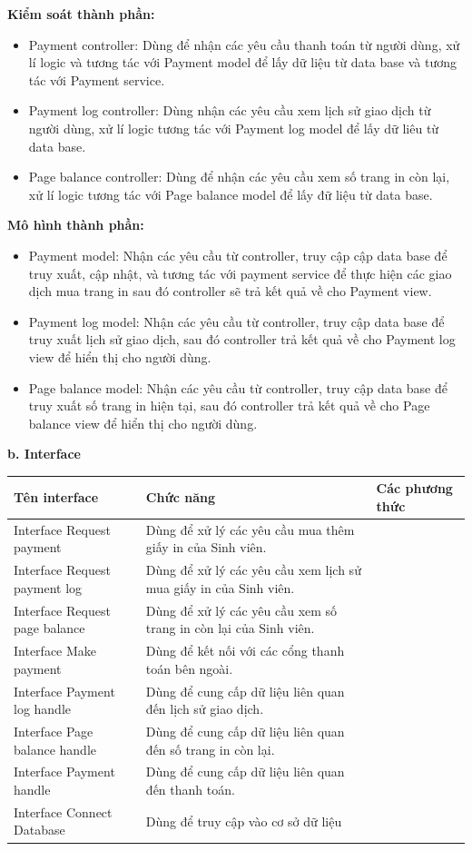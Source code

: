 \documentclass[a4paper]{article}
\begin{document}
\noindent \textbf{Kiểm soát thành phần:}
\begin{itemize}
    \item Payment controller: Dùng để nhận các yêu cầu thanh toán từ người dùng, xử lí logic và tương tác với Payment model để lấy dữ liệu từ data base và tương tác với Payment service. 
    \item Payment log controller: Dùng nhận các yêu cầu xem lịch sử giao dịch từ người dùng, xử lí logic tương tác với Payment log model để lấy dữ liêu từ data base.
    \item Page balance controller: Dùng để nhận các yêu cầu xem số trang in còn lại, xử lí logic tương tác với Page balance model để lấy đữ liệu từ data base.
\end{itemize}
\noindent \textbf{Mô hình thành phần:}
\begin{itemize}
    \item Payment model: Nhận các yêu cầu từ controller, truy cập cập data base để truy xuất, cập nhật, và tương tác với payment service để thực hiện các giao dịch mua trang in sau đó controller sẽ trả kết quả về cho Payment view.
    \item Payment log model: Nhận các yêu cầu từ controller, truy cập data base để truy xuất lịch sử giao dịch, sau đó controller trả kết quả về cho Payment log view để hiển thị cho người dùng.
     \item Page balance model: Nhận các yêu cầu từ controller, truy cập data base để truy xuất số trang in hiện tại, sau đó controller trả kết quả về cho Page balance view để hiển thị cho người dùng.
\end{itemize}

\noindent \textbf{b. Interface}
\begin{table}[h!]
\centering
\begin{tabular}{|M{3cm}|p{6cm}|p{5.5cm}|}
\hline
\textbf{Tên interface} & \textbf{Chức năng} & \textbf{Các phương thức} \\
\hline
Interface Request payment & Dùng để xử lý các yêu cầu mua thêm giấy in của Sinh viên. & \\
\hline
Interface Request payment log & Dùng để xử lý các yêu cầu xem lịch sử mua giấy in của Sinh viên. &  \\
\hline
Interface Request page balance & Dùng để xử lý các yêu cầu xem số trang in còn lại của Sinh viên. & \\
\hline
Interface Make payment & Dùng để kết nối với các cổng thanh toán bên ngoài. &  \\
\hline
Interface Payment log handle & Dùng để cung cấp dữ liệu liên quan đến lịch sử giao dịch. & \\
\hline
Interface Page balance handle & Dùng để cung cấp dữ liệu liên quan đến số trang in còn lại. &  \\
\hline
Interface Payment handle & Dùng để cung cấp dữ liệu liên quan đến thanh toán. & \\
\hline
Interface Connect Database & Dùng để truy cập vào cơ sở dữ liệu & \\
\hline
\end{tabular}
\end{table}
\end{document}
